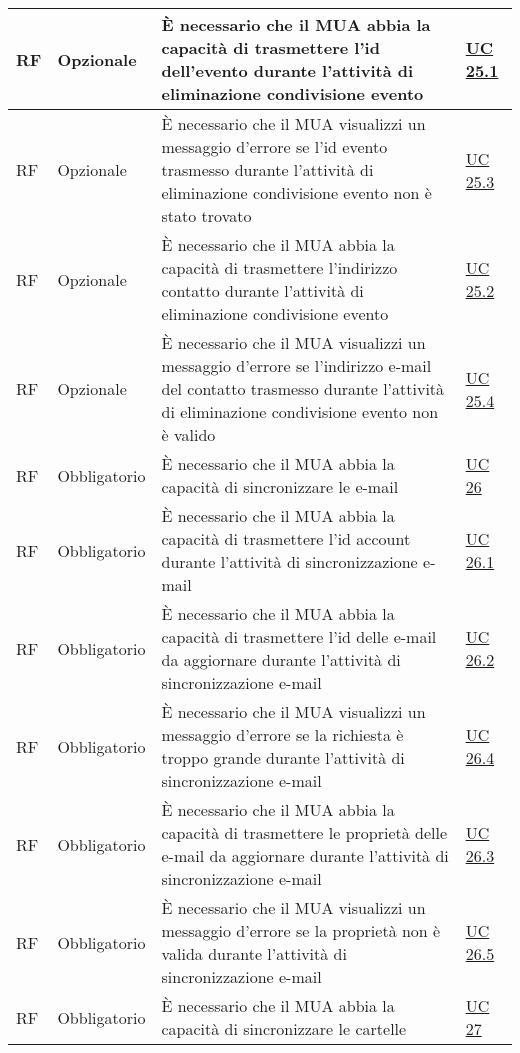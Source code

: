 \begin{longtable}{*{1}{>{\centering\arraybackslash}p{1.5cm}}*{1}{>{\centering\arraybackslash}p{2.5cm}}p{6cm}*{1}{>{\centering\arraybackslash}p{3cm}}}
    \\\hline
    RF & Opzionale & È necessario che il MUA abbia la capacità di trasmettere l'id dell'evento durante l'attività di eliminazione condivisione evento & \hyperref[sec:UC25.1]{UC 25.1}
    \\\hline
    RF & Opzionale & È necessario che il MUA visualizzi un messaggio d'errore se l'id evento trasmesso durante l'attività di eliminazione condivisione evento non è stato trovato & \hyperref[sec:UC25.3]{UC 25.3}
    \\\hline
    RF & Opzionale & È necessario che il MUA abbia la capacità di trasmettere l'indirizzo contatto durante l'attività di eliminazione condivisione evento & \hyperref[sec:UC25.2]{UC 25.2}
    \\\hline
    RF & Opzionale & È necessario che il MUA visualizzi un messaggio d'errore se l'indirizzo e-mail del contatto trasmesso durante l'attività di eliminazione condivisione evento non è valido & \hyperref[sec:UC25.4]{UC 25.4}
    \\\hline
    RF & Obbligatorio & È necessario che il MUA abbia la capacità di sincronizzare le e-mail & \hyperref[sec:UC26]{UC 26}
    \\\hline
    RF & Obbligatorio & È necessario che il MUA abbia la capacità di trasmettere l'id account durante l'attività di sincronizzazione e-mail & \hyperref[sec:UC26.1]{UC 26.1}
    \\\hline
    RF & Obbligatorio & È necessario che il MUA abbia la capacità di trasmettere l'id delle e-mail da aggiornare durante l'attività di sincronizzazione e-mail & \hyperref[sec:UC26.2]{UC 26.2}
    \\\hline
    RF & Obbligatorio & È necessario che il MUA visualizzi un messaggio d'errore se la richiesta è troppo grande durante l'attività di sincronizzazione e-mail & \hyperref[sec:UC26.4]{UC 26.4}
    \\\hline
    RF & Obbligatorio & È necessario che il MUA abbia la capacità di trasmettere le proprietà delle e-mail da aggiornare durante l'attività di sincronizzazione e-mail & \hyperref[sec:UC26.3]{UC 26.3}
    \\\hline
    RF & Obbligatorio & È necessario che il MUA visualizzi un messaggio d'errore se la proprietà non è valida durante l'attività di sincronizzazione e-mail & \hyperref[sec:UC26.5]{UC 26.5}
    \\\hline
    RF & Obbligatorio & È necessario che il MUA abbia la capacità di sincronizzare le cartelle & \hyperref[sec:UC27]{UC 27}
    \\\hline

\end{longtable}
